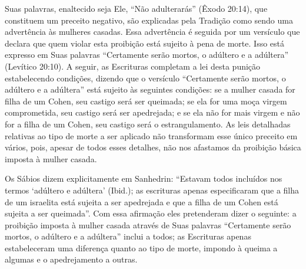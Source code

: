 Suas palavras, enaltecido seja Ele, ``Não adulterarás'' (Êxodo 20:14),
que constituem um preceito negativo, são explicadas pela Tradição como
sendo uma advertência às mulheres casadas. Essa advertência é seguida
por um versículo que declara que quem violar esta proibição está sujeito
à pena de morte. Isso está expresso em Suas palavras ``Certamente serão
mortos, o adúltero e a adúltera'' (Levítico 20:10). A seguir, as
Escrituras completam a lei desta punição estabelecendo condições,
dizendo que o versículo ``Certamente serão mortos, o adúltero e a
adúltera'' está sujeito às seguintes condições: se a mulher casada for
filha de um Cohen, seu castigo será ser queimada; se ela for uma
moça virgem comprometida, seu castigo será ser apedrejada; e se ela não
for mais virgem e não for a filha de um Cohen, seu castigo será o
estrangulamento. As leis detalhadas relativas ao tipo de morte a ser
aplicado não transformam esse único preceito em vários, pois, apesar de
todos esses detalhes, não nos afastamos da proibição básica imposta à
mulher casada.

Os Sábios dizem explicitamente em Sanhedrin: ``Estavam todos incluídos
nos termos `adúltero e adúltera' (Ibid.); as escrituras apenas
especificaram que a filha de um israelita está sujeita a ser apedrejada
e que a filha de um Cohen está sujeita a ser queimada''. Com essa
afirmação eles pretenderam dizer o seguinte: a proibição imposta à
mulher casada através de Suas palavras ``Certamente serão mortos, o
adúltero e a adúltera'' inclui a todos; as Escrituras apenas
estabeleceram uma diferença quanto ao tipo de morte, impondo à queima a
algumas e o apedrejamento a outras.

